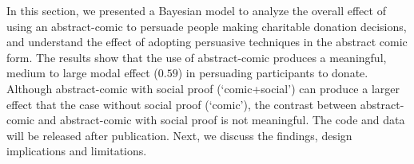 In this section, we presented a Bayesian model to analyze the overall effect of using an abstract-comic to persuade people making charitable donation decisions, and understand the effect of adopting persuasive techniques in the abstract comic form. The results show that the use of abstract-comic produces a meaningful, medium to large modal effect ($0.59$) in persuading participants to donate. Although abstract-comic with social proof (`comic+social') can produce a larger effect that the case without social proof (`comic'), the contrast between abstract-comic and abstract-comic with social proof is not meaningful. The code and data will be released after publication. Next, we discuss the findings, design implications and limitations.
